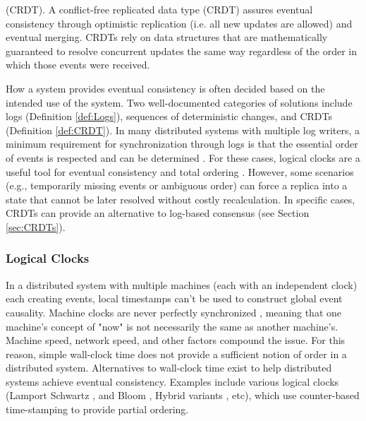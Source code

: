 \documentclass{textile}
\begin{document}
\begin{definition}
  (CRDT). A conflict-free replicated data type (CRDT) assures eventual consistency through optimistic replication (i.e. all new updates are allowed) and eventual merging. CRDTs rely on data structures that are mathematically guaranteed to resolve concurrent updates the same way regardless of the order in which those events were received.
\end{definition} \label{def:CRDT}

How a system provides eventual consistency is often decided based on the intended use of the system. Two well-documented categories of solutions include logs (Definition  \ref{def:Logs}), sequences of deterministic changes, and CRDTs (Definition  \ref{def:CRDT}). In many distributed systems with multiple log writers, a minimum requirement for synchronization through logs is that the essential order of events is respected and can be determined \cite{schwarzDetectingCausalRelationships1994,katzInterleavingSetTemporal1990}. For these cases, logical clocks are a useful tool for eventual consistency and total ordering \cite{kulkarniLogicalPhysicalClocks2014}. However, some scenarios (e.g., temporarily missing events or ambiguous order) can force a replica into a state that cannot be later resolved without costly recalculation. In specific cases, CRDTs can provide an alternative to log-based consensus (see Section \ref{sec:CRDTs}). 

\subsubsection{Logical Clocks}\label{sec:LogicalClocks}

In a distributed system with multiple machines (each with an independent clock) each creating events, local timestamps can't be used to construct global event causality. Machine clocks are never perfectly synchronized \cite{lamportTimeClocksOrdering1978}, meaning that one machine's concept of "now" is not necessarily the same as another machine's. Machine speed, network speed, and other factors compound the issue. For this reason, simple wall-clock time does not provide a sufficient notion of order in a distributed system. Alternatives to wall-clock time exist to help distributed systems achieve eventual consistency. Examples include various logical clocks (Lamport \cite{lamportTimeClocksOrdering1978} Schwartz \cite{schwarzDetectingCausalRelationships1994}, and Bloom \cite{ramabajaBloomClock2019}, Hybrid variants \cite{kulkarniLogicalPhysicalClocks2014}, etc), which use counter-based time-stamping to provide partial ordering. 
\end{document}

